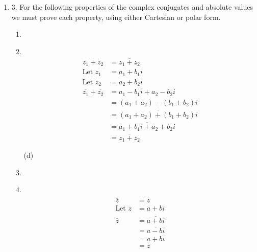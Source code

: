 \documentclass[fleqn]{article}
\newenvironment{answers}{ %
	\begin{enumerate}
		\setlength{\itemsep}{\bigskipamount}
}{\end{enumerate}}
\newcommand\Item[1][]{ %
  \ifx\relax#1\relax  \item \else \item[#1] \fi
  \abovedisplayskip=0pt\abovedisplayshortskip=0pt~\vspace*{-\baselineskip}}
\begin{document}
\begin{answers}
\begin{enumerate}
			\Item[(d)]
				\begin{align*}
					z^2 + |z|^2                  & = 2 - 4i \\
					(a+bi)^2 + |a+bi|^2          & = 2 - 4i \\
					(a+bi)^2 + \sqrt{a^2+b^2}^2  & = 2 - 4i \\
					a^2 - b^2 + 2abi + a^2 + b^2 & = 2 - 4i \\
					2a^2 + 2abi                  & = 2 - 4i \\
					2a^2                         & = 2 \\
					2ab                          & = -4 \\
					a^2                          & = 1 \\
					b                            & = - \frac{2}{a} \\
					a                            & = \pm 1 \\
					b                            & = \mp 2 \\
					z_1                          & = 1 - 2i \\
					z_2                          & = -1 + 2i
				\end{align*}
		\end{enumerate}

	\item[3.]
		For the following properties of the complex conjugates and absolute values we must prove each property, using either Cartesian or polar form.
		\begin{enumerate}
			\Item[(a)]
				\begin{align*}
					\overline{z_1} + \overline{z_2} & = \overline{z_1 + z_2} \\
					\text{Let } z_1                 & = a_1 + b_1i \\
					\text{Let } z_2                 & = a_2 + b_2i \\
					\overline{z_1} + \overline{z_2} & = a_1 - b_1i + a_2 - b_2i \\
					                                & = (a_1 + a_2) - (b_1 + b_2)i \\
					                                & = \overline{(a_1 + a_2) + (b_1 + b_2)i} \\
					                                & = \overline{a_1 + b_1i + a_2 + b_2i} \\
					                                & =\overline{z_1 + z_2}
				\end{align*}

			\Item[(d)]
				\begin{align*}
					\overline{\overline{z}} & = z \\
					\text{Let } z           & = a + bi \\
					\overline{\overline{z}} & = \overline{\overline{a + bi}} \\
					                        & = \overline{a - bi} \\
					                        & = a + bi \\
					                        & = z
				\end{align*}
		\end{enumerate}


\end{answers}
\end{document}

